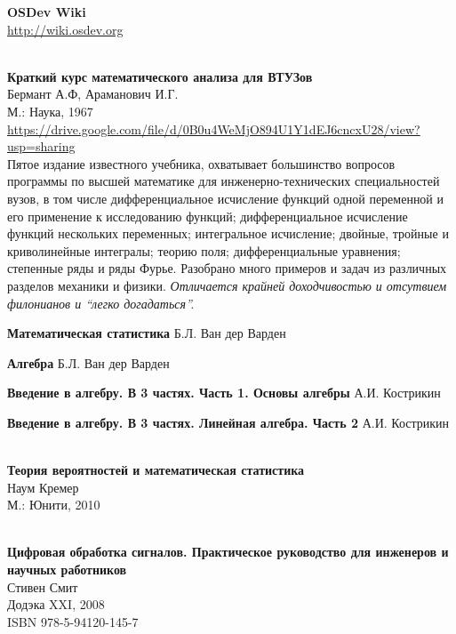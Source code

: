 \begin{thebibliography}{99}

 \textbf{OSDev Wiki}\\
\url{http://wiki.osdev.org}



 \\
\textbf{Краткий курс математического анализа для ВТУЗов}\\
Бермант А.Ф, Араманович И.Г.\\
М.: Наука, 1967\\
\url{https://drive.google.com/file/d/0B0u4WeMjO894U1Y1dEJ6cncxU28/view?usp=sharing}\\

Пятое издание известного учебника, охватывает большинство вопросов программы по
высшей математике для инженерно-технических специальностей вузов, в том числе
дифференциальное исчисление функций одной переменной и его применение к
исследованию функций; дифференциальное исчисление функций нескольких переменных;
интегральное исчисление; двойные, тройные и криволинейные интегралы; теорию
поля; дифференциальные уравнения; степенные ряды и ряды Фурье. Разобрано много
примеров и задач из различных разделов механики и физики. \emph{Отличается
крайней доходчивостью и отсутвием филонианов и ``легко догадаться''.}

\textbf{Математическая статистика}
Б.Л. Ван дер Варден

\textbf{Алгебра}
Б.Л. Ван дер Варден

\textbf{Введение в алгебру. В 3 частях. Часть 1. Основы алгебры}
А.И. Кострикин

\textbf{Введение в алгебру. В 3 частях. Линейная алгебра. Часть 2}
А.И. Кострикин

 \\
\textbf{Теория вероятностей и математическая статистика}\\
Наум Кремер\\
М.: Юнити, 2010

\ \\
\textbf{Цифровая обработка сигналов. Практическое руководство для инженеров и
научных работников}\\
Стивен Смит\\
Додэка XXI, 2008\\ISBN 978-5-94120-145-7


\end{thebibliography}
